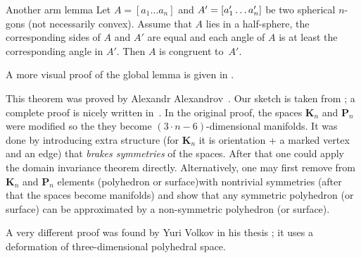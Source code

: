 \begin{thm}{Another arm lemma}
Let $A=[a_1\dots a_n]$ and $A'\z=[a'_1\z\dots a'_n]$ be two spherical $n$-gons (not necessarily convex).
Assume that $A$ lies in a half-sphere,
the corresponding sides of $A$ and $A'$ are equal
and each angle of $A$ is at least the corresponding angle in $A'$.
Then $A$ is congruent to~$A'$. 
\end{thm}

A more visual proof of the global lemma is given in \cite[II \S 1.3]{alexandrov}.

This theorem was proved by Alexandr Alexandrov~\cite{alexandrov-1941}.
Our sketch is taken from \cite{lebedeva-petrunin};
a complete proof is nicely written in~\cite{alexandrov}.
In the original proof, the spaces $\mathbf{K}_n$ and $\mathbf{P}_n$ were modified so the they become $(3\cdot n-6)$-dimensional manifolds.
It was done by introducing extra structure (for $\mathbf{K}_n$ it is orientation + a marked vertex and an edge) that \textit{brakes symmetries} of the spaces.
After that one could apply the domain invariance theorem directly.
Alternatively, one may first remove from $\mathbf{K}_n$ and $\mathbf{P}_n$ elements (polyhedron or surface)with nontrivial symmetries (after that the spaces become manifolds) and show that any symmetric polyhedron (or surface) can be approximated by a non-symmetric polyhedron (or surface).

A very different proof was found by Yuri Volkov in his thesis \cite{volkov};
it uses a deformation of three-dimensional polyhedral space.

